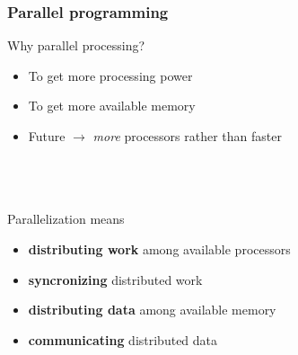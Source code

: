\begin{frame}
    \frametitle{Parallel programming}
    Why parallel processing?
    \begin{itemize}
	\item	To get more processing power
	\item	To get more available memory
	\item	Future $\rightarrow$ \emph{more} processors rather than faster
    \end{itemize}
    \ \\
    \ \\
    \ \\
    \pause
    Parallelization means
    \begin{itemize}
	\item	\textbf{distributing work} among available processors
	\item	\textbf{syncronizing} distributed work
	\item	\textbf{distributing data} among available memory
	\item	\textbf{communicating} distributed data
    \end{itemize}
\end{frame}

